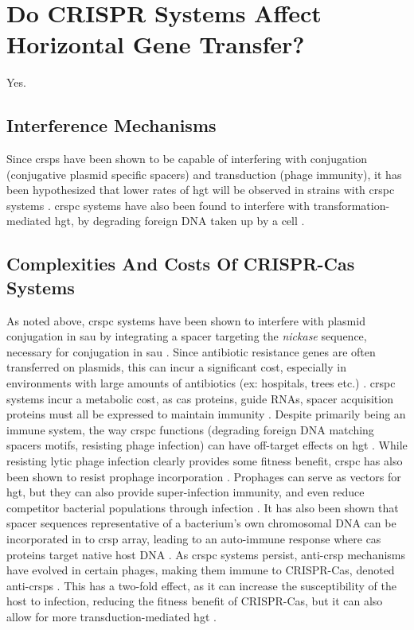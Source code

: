 \section{Do CRISPR Systems Affect Horizontal Gene Transfer?}
Yes.
\subsection{Interference Mechanisms}
Since \ac{crsp}s have been shown to be capable of interfering with conjugation (conjugative plasmid specific spacers) and transduction (phage immunity), it has been hypothesized that lower rates of \ac{hgt} will be observed in strains with \ac{crspc} systems \citep{staphlim}.
\ac{crspc} systems have also been found to interfere with transformation-mediated \ac{hgt}, by degrading foreign DNA taken up by a cell \citep{climtrans}.
\subsection{Complexities And Costs Of CRISPR-Cas Systems}
As noted above, \ac{crspc} systems have been shown to interfere with plasmid conjugation in \ac{sau} by integrating a spacer targeting the \textit{nickase} sequence, necessary for conjugation in \ac{sau} \citep{staphlim}.
Since antibiotic resistance genes are often transferred on plasmids, this can incur a significant cost, especially in environments with large amounts of antibiotics (ex: hospitals, trees etc.) \citep{hospital}.
\ac{crspc} systems incur a metabolic cost, as \ac{cas} proteins, guide RNAs, spacer acquisition proteins must all be expressed to maintain immunity \citep{crispgen}.
Despite primarily being an immune system, the way \ac{crspc} functions (degrading foreign DNA matching spacers motifs, resisting phage infection) can have off-target effects on \ac{hgt} \citep{acqorres}.
While resisting lytic phage infection clearly provides some fitness benefit, \ac{crspc} has also been shown to resist prophage incorporation \citep{acqorres}.
Prophages can serve as vectors for \ac{hgt}, but they can also provide super-infection immunity, and even reduce competitor bacterial populations through infection \citep{acqorres,transhgt}.
It has also been shown that spacer sequences representative of a bacterium's own chromosomal DNA can be incorporated in to \ac{crsp} array, leading to an auto-immune response where \ac{cas} proteins target native host DNA \citep{selfcrisp}.
As \ac{crspc} systems persist, anti-\ac{crsp} mechanisms have evolved in certain phages, making them immune to CRISPR-Cas, denoted anti-\ac{crsp}s \citep{acqorres}.
This has a two-fold effect, as it can increase the susceptibility of the host to infection, reducing the fitness benefit of CRISPR-Cas, but it can also allow for more transduction-mediated \ac{hgt} \citep{acqorres}.

